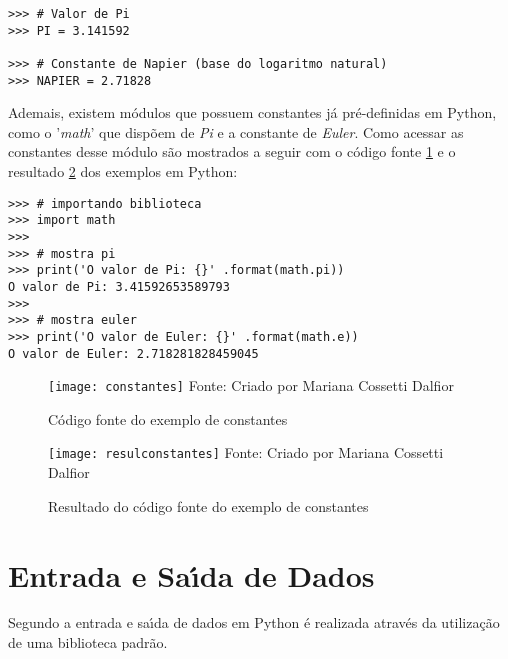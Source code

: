 	
\begin{lstlisting}
>>> # Valor de Pi
>>> PI = 3.141592

>>> # Constante de Napier (base do logaritmo natural)
>>> NAPIER = 2.71828
\end{lstlisting}
	 
Ademais, existem m\'{o}dulos que possuem constantes j\'{a} pr\'{e}-definidas em Python, como o '\textsl{math}' que disp\~{o}em de \textsl{Pi} e a constante de \textsl{Euler}. Como acessar as constantes desse m\'{o}dulo são mostrados a seguir com o c\'{o}digo fonte \ref{fontecons} e o resultado \ref{resulcons} dos exemplos em Python:
	
\begin{lstlisting}
>>> # importando biblioteca
>>> import math
>>>
>>> # mostra pi
>>> print('O valor de Pi: {}' .format(math.pi))
O valor de Pi: 3.41592653589793
>>> 
>>> # mostra euler
>>> print('O valor de Euler: {}' .format(math.e))
O valor de Euler: 2.718281828459045
\end{lstlisting}

\begin{figure}[H]
\begin{center}
	\caption{C\'{o}digo fonte do exemplo de constantes} \label{fontecons}
	\texttt{[image: constantes]} 
	\newline
	Fonte: Criado por Mariana Cossetti Dalfior
\end{center}
\end{figure}

\begin{figure}[H]
\begin{center}
	\caption{Resultado do c\'{o}digo fonte do exemplo de constantes} \label{resulcons}
	\texttt{[image: resulconstantes]} 
	\newline
	Fonte: Criado por Mariana Cossetti Dalfior
\end{center}
\end{figure}

	\section{Entrada e Sa\'{\i}da de Dados}
Segundo \cite{Yoon2022} a entrada e sa\'{\i}da de dados em Python \'{e} realizada atrav\'{e}s da utiliza\c{c}\~{a}o de uma biblioteca padr\~{a}o.

